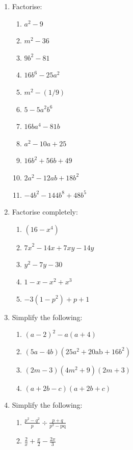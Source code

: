       \label{m39392*id281011}\begin{enumerate}[noitemsep, label=\textbf{\arabic*}. ] 
            \label{m39392*uid55}\item Factorise:
\label{m39392*id281026}\begin{enumerate}[noitemsep, label=\textbf{\alph*}. ] 
            \item ${a}^{2}-9$\item ${m}^{2}-36$\item $9{b}^{2}-81$\item $16{b}^{6}-25{a}^{2}$\item ${m}^{2}-\left(1/9\right)$\item $5-5{a}^{2}{b}^{6}$\item $16b{a}^{4}-81b$\item ${a}^{2}-10a+25$\item $16{b}^{2}+56b+49$\item $2{a}^{2}-12ab+18{b}^{2}$\item $-4{b}^{2}-144{b}^{8}+48{b}^{5}$\end{enumerate}
                \label{m39392*id632}\item Factorise completely: \label{m39392*id6423}\begin{enumerate}[noitemsep, label=\textbf{\alph*}. ] 
            \item $\left(16-{x}^{4}\right)$\item ${7x}^{2}-14x+7xy-14y$
\item ${y}^{2}-7y-30$
\item $1-x-{x}^{2}+{x}^{3}$
\item $-3\left(1-{p}^{2}\right)+p+1$\end{enumerate}
\item Simplify the following:
\label{m39392*eip-id1166762435067}\begin{enumerate}[noitemsep, label=\textbf{\alph*}. ] 
            \item ${\left(a-2\right)}^{2}-a\left(a+4\right)$\item $\left(5a-4b\right)\left(25{a}^{2}+20\mathrm{ab}+16{b}^{2}\right)$\item $\left(2m-3\right)\left(4{m}^{2}+9\right)\left(2m+3\right)$\item $\left(a+2b-c\right)\left(a+2b+c\right)$\end{enumerate}
\item Simplify the following:
\label{m39392*eip-id1153}\begin{enumerate}[noitemsep, label=\textbf{\alph*}. ] 
            \item $\frac{{p}^{2}-{q}^{2}}{p}÷\frac{p+q}{{p}^{2}-\mathrm{pq}}$\item $\frac{2}{x}+\frac{x}{2}-\frac{2x}{3}$\end{enumerate}

\end{enumerate}

